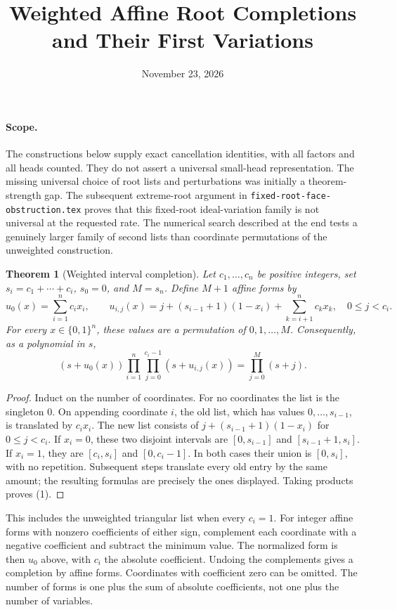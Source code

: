 \documentclass[11pt]{article}
\title{Weighted Affine Root Completions and Their First Variations}
\author{}
\date{November 23, 2026}
\newtheorem{theorem}{Theorem}
\begin{document}
\maketitle

\paragraph{Scope.}
The constructions below supply exact cancellation identities, with all
factors and all heads counted. They do not assert a universal small-head
representation. The missing universal choice of root lists and
perturbations was initially a theorem-strength gap. The subsequent
extreme-root argument in \texttt{fixed-root-face-obstruction.tex}
proves that this fixed-root ideal-variation family is not universal
at the requested rate. The numerical search
described at the end tests a genuinely larger family of second lists
than coordinate permutations of the unweighted construction.

\begin{theorem}[Weighted interval completion]
Let $c_1,\ldots,c_n$ be positive integers, set
$s_i=c_1+\cdots+c_i$, $s_0=0$, and $M=s_n$.
Define $M+1$ affine forms by
\[
 u_0(x)=\sum_{i=1}^n c_i x_i,
 \qquad
 u_{i,j}(x)=j+(s_{i-1}+1)(1-x_i)+\sum_{k=i+1}^n c_kx_k,
 \quad 0\le j<c_i.
\]
For every $x\in\{0,1\}^n$, these values are a permutation of
$0,1,\ldots,M$. Consequently, as a polynomial in $s$,
\[
 (s+u_0(x))\prod_{i=1}^n\prod_{j=0}^{c_i-1}(s+u_{i,j}(x))
                         =\prod_{j=0}^{M}(s+j).
\tag{1}
\]
\end{theorem}
\begin{proof}
Induct on the number of coordinates. For no coordinates the list is
the singleton $0$. On appending coordinate $i$, the old list, which
has values $0,\ldots,s_{i-1}$, is translated by $c_ix_i$.
The new list consists of
$j+(s_{i-1}+1)(1-x_i)$ for $0\le j<c_i$.
If $x_i=0$, these two disjoint intervals are
$[0,s_{i-1}]$ and $[s_{i-1}+1,s_i]$.
If $x_i=1$, they are $[c_i,s_i]$ and $[0,c_i-1]$.
In both cases their union is $[0,s_i]$, with no repetition.
Subsequent steps translate every old entry by the same amount;
the resulting formulas are precisely the ones displayed.
Taking products proves (1).
\end{proof}


This includes the unweighted triangular list when every $c_i=1$.
For integer affine forms with nonzero coefficients of either sign,
complement each coordinate with a negative coefficient and subtract
the minimum value. The normalized form is then $u_0$ above, with
$c_i$ the absolute coefficient. Undoing the complements gives a
completion by affine forms. Coordinates with coefficient zero can be
omitted. The number of forms is one plus the sum of absolute
coefficients, not one plus the number of variables.
\end{document}
